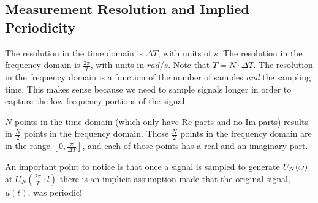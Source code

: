 \subsection{Measurement Resolution and Implied Periodicity}
The resolution in the time domain is $\Delta T$, with units of $s$. The resolution in the frequency domain is $\frac{2\pi}{T}$, with units in $rad/s$. Note that $T=N\cdot\Delta T$. The resolution in the frequency domain is a function of the number of samples \textit{and} the sampling time. This makes sense because  we need to sample signals longer in order to capture the low-frequency portions of the signal.

$N$ points in the time domain (which only have $\text{Re}$ parts and no $\text{Im}$ parts) results in $\frac{N}{2}$ points in the frequency domain. Those $\frac{N}{2}$ points in the frequency domain are in the range $[0,\frac{\pi}{\Delta T}]$, and each of those points has a real and an imaginary part.

An important point to notice is that once a signal is sampled to generate $U_N(\omega)$ at $U_N(\frac{2\pi}{T}\cdot l)$ there is an implicit assumption made that the original signal, $u(t)$, was periodic!


% 

